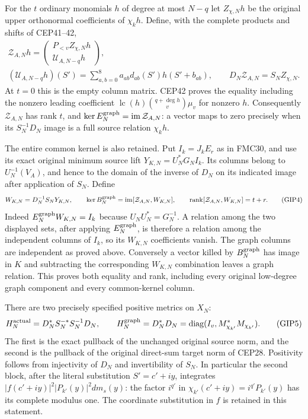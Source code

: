 \documentclass[11pt,a4paper]{article}
\begin{document}
For the $t$ ordinary monomials $h$ of degree at most $N-q$ let
$Z_{\chi,N}h$ be the original upper orthonormal coefficients of
$\chi_kh$. Define, with the complete products and shifts of CEP41--42,
\[
 \begin{gathered}
 \mathcal Z_{A,N}h=
   \begin{pmatrix}P_{<v}Z_{\chi,N}h\\\mathcal U_{A,N-q}h\end{pmatrix},\\
 (\mathcal U_{A,N-q}h)(S')
       =\sum_{a,b=0}^8a_{ab}d_{ab}(S')h(S'+b_{ab}),\qquad
 D_N\mathcal Z_{A,N}=S_NZ_{\chi,N}.
 \end{gathered}\tag{GIP3}
\]
At $t=0$ this is the empty column matrix. CEP42 proves the equality
including the nonzero leading coefficient
$\operatorname{lc}(h)\binom{q+\deg h}{v}\mu_v$ for nonzero $h$. Consequently
$\mathcal Z_{A,N}$ has rank $t$, and
$\ker E_N^{\rm graph}=\operatorname{im}\mathcal Z_{A,N}$:
a vector maps to zero precisely when its $S_N^{-1}D_N$ image
is a full source relation $\chi_kh$.

The entire common kernel is also retained. Put $I_k=J_kE_r$ as
in FMC30, and use its exact original minimum source lift
$Y_{K,N}=U_N^*G_NI_k$. Its columns belong to
$U_N^{-1}(V_A)$, and hence to the domain of the inverse of $D_N$
on its indicated image after application of $S_N$. Define
\[
 W_{K,N}=D_N^{-1}S_NY_{K,N},\qquad
 \ker B_N^{\rm graph}
    =\operatorname{im}[\mathcal Z_{A,N},W_{K,N}],\qquad
 \operatorname{rank}[\mathcal Z_{A,N},W_{K,N}]=t+r.
 \tag{GIP4}
\]
Indeed $E_N^{\rm graph}W_{K,N}=I_k$ because $U_NU_N^*=G_N^{-1}$.
A relation among the two displayed sets, after applying
$E_N^{\rm graph}$, is therefore a relation among the independent
columns of $I_k$, so its $W_{K,N}$ coefficients vanish. The graph
columns are independent as proved above. Conversely a vector killed
by $B_N^{\rm graph}$ has image in $K$ and subtracting the
corresponding $W_{K,N}$ combination leaves a graph relation.
This proves both equality and rank, including every original
low-degree graph component and every common-kernel column.

There are two precisely specified positive metrics on $X_N$:
\[
 H_N^{\rm actual}=D_N^*S_N^{-*}S_N^{-1}D_N,\qquad
 H_N^{\rm graph}=D_N^*D_N
       =\operatorname{diag}(I_v,M_{\chi_{k'}}^*M_{\chi_{k'}}).
 \tag{GIP5}
\]
The first is the exact pullback of the unchanged original source
norm, and the second is the pullback of the original direct-sum
target norm of CEP28. Positivity follows from injectivity of $D_N$
and invertibility of $S_N$. In particular the second block, after
the literal substitution $S'=c'+iy$, integrates
$|f(c'+iy)|^2|P_{k'}(y)|^2dm_s(y)$: the factor $i^{q'}$
in $\chi_{k'}(c'+iy)=i^{q'}P_{k'}(y)$ has its complete modulus one.
The coordinate substitution in $f$ is retained in this statement.
\end{document}
